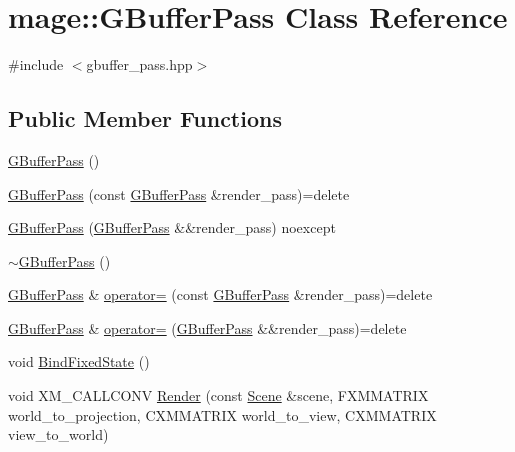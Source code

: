 \hypertarget{classmage_1_1_g_buffer_pass}{}\section{mage\+:\+:G\+Buffer\+Pass Class Reference}
\label{classmage_1_1_g_buffer_pass}


{\ttfamily \#include $<$gbuffer\+\_\+pass.\+hpp$>$}

\subsection*{Public Member Functions}
\begin{DoxyCompactItemize}
\item 
\hyperlink{classmage_1_1_g_buffer_pass_afe455d4051cddf84b7752b4bf4aa282f}{G\+Buffer\+Pass} ()
\item 
\hyperlink{classmage_1_1_g_buffer_pass_a3b9f59097aef9175f942c9c9424d0dab}{G\+Buffer\+Pass} (const \hyperlink{classmage_1_1_g_buffer_pass}{G\+Buffer\+Pass} \&render\+\_\+pass)=delete
\item 
\hyperlink{classmage_1_1_g_buffer_pass_a86b04cb5e55d63a2fabc041ef0c7dcf9}{G\+Buffer\+Pass} (\hyperlink{classmage_1_1_g_buffer_pass}{G\+Buffer\+Pass} \&\&render\+\_\+pass) noexcept
\item 
\hyperlink{classmage_1_1_g_buffer_pass_a34b2735cfb9b3546c903760f42ff770c}{$\sim$\+G\+Buffer\+Pass} ()
\item 
\hyperlink{classmage_1_1_g_buffer_pass}{G\+Buffer\+Pass} \& \hyperlink{classmage_1_1_g_buffer_pass_a79468fb8b4547197315c0aabbabffa71}{operator=} (const \hyperlink{classmage_1_1_g_buffer_pass}{G\+Buffer\+Pass} \&render\+\_\+pass)=delete
\item 
\hyperlink{classmage_1_1_g_buffer_pass}{G\+Buffer\+Pass} \& \hyperlink{classmage_1_1_g_buffer_pass_ace14aafdd028f12296b3fabf1e36ca02}{operator=} (\hyperlink{classmage_1_1_g_buffer_pass}{G\+Buffer\+Pass} \&\&render\+\_\+pass)=delete
\item 
void \hyperlink{classmage_1_1_g_buffer_pass_a4a13364cc0318417f31df50d7081b0b0}{Bind\+Fixed\+State} ()
\item 
void X\+M\+\_\+\+C\+A\+L\+L\+C\+O\+NV \hyperlink{classmage_1_1_g_buffer_pass_a02778a5eb3947980b204bd99daefe533}{Render} (const \hyperlink{classmage_1_1_scene}{Scene} \&scene, F\+X\+M\+M\+A\+T\+R\+IX world\+\_\+to\+\_\+projection, C\+X\+M\+M\+A\+T\+R\+IX world\+\_\+to\+\_\+view, C\+X\+M\+M\+A\+T\+R\+IX view\+\_\+to\+\_\+world)
\end{DoxyCompactItemize}
